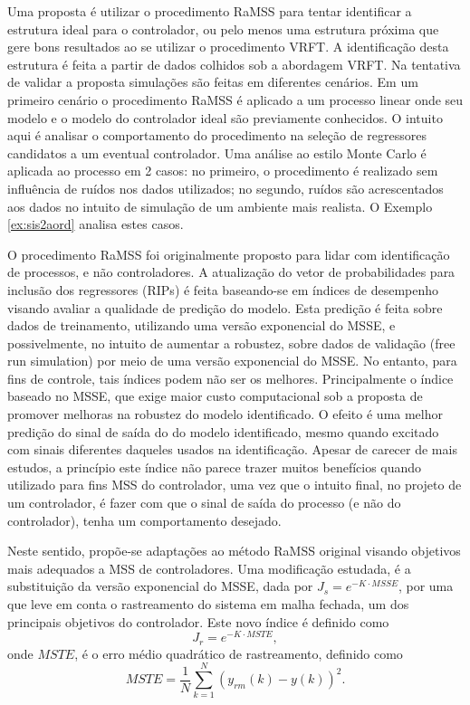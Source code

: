 Uma proposta é utilizar o procedimento RaMSS para tentar identificar a estrutura ideal para o controlador, ou pelo menos uma estrutura próxima que gere bons resultados ao se utilizar o procedimento VRFT. A identificação desta estrutura é feita a partir de dados colhidos sob a abordagem VRFT. Na tentativa de validar a proposta simulações são feitas em diferentes cenários. 
Em um primeiro cenário o procedimento RaMSS é aplicado a um processo linear onde seu modelo e o modelo do controlador ideal são previamente conhecidos. O intuito aqui é analisar o comportamento do procedimento na seleção de regressores candidatos a um eventual controlador. Uma análise ao estilo Monte Carlo é aplicada ao processo em 2 casos: no primeiro, o procedimento é realizado sem influência de ruídos nos dados utilizados; no segundo, ruídos são acrescentados aos dados no intuito de simulação de um ambiente mais realista. O Exemplo \ref{ex:sis2aord} analisa estes casos.

O procedimento RaMSS foi originalmente proposto para lidar com identificação de processos, e não controladores.
A atualização do vetor de probabilidades para inclusão dos regressores (RIPs) é feita baseando-se em índices de desempenho visando avaliar a qualidade de predição do modelo. 
Esta predição é feita sobre dados de treinamento, utilizando uma versão exponencial do MSSE, e possivelmente, no intuito de aumentar a robustez, sobre dados de validação (free run simulation) por meio de uma versão exponencial do MSSE.
No entanto, para fins de controle, tais índices podem não ser os melhores.
Principalmente o índice baseado no MSSE, que exige maior custo computacional sob a proposta de promover melhoras na robustez do modelo identificado. O efeito é uma melhor predição do sinal de saída do do modelo identificado, mesmo quando excitado com sinais diferentes daqueles usados na identificação. 
Apesar de carecer de mais estudos, a princípio este índice não parece trazer muitos benefícios quando utilizado para fins MSS do controlador, uma vez que o intuito final, no projeto de um controlador, é fazer com que o sinal de saída do processo (e não do controlador), tenha um comportamento desejado. 

Neste sentido, propõe-se adaptações ao método RaMSS original visando objetivos mais adequados a MSS de controladores. Uma modificação estudada, é a substituição da versão exponencial do MSSE, dada por $J_s= e^{-K\cdot MSSE}$, por uma que leve em conta o rastreamento do sistema em malha fechada, um dos principais objetivos do controlador. Este novo índice é definido como
\begin{equation}
  J_r=e^{-K\cdot MSTE},
  \label{eq:}
\end{equation}
onde $MSTE$, é o erro médio quadrático de rastreamento, definido como 
\begin{equation}
  MSTE = \frac{1}{N}\sum_{k=1}^{N} (y_{rm}(k)-y(k))^2.
  \label{eq:}
\end{equation}

